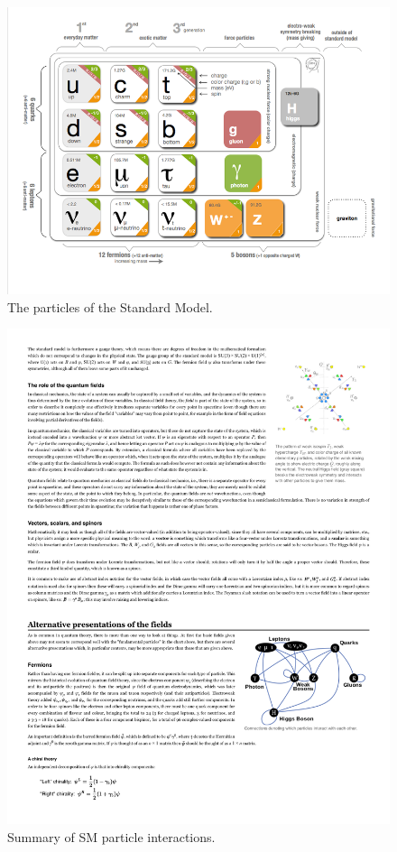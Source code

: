 \begin{figure}[h!]
  \centering
  \includegraphics[width=\hsize]{figures/theory/particles.png}
  \caption{The particles of the Standard Model.} 
  \label{fig:sm_particles}
\end{figure}
\FloatBarrier

\begin{figure}[h!]
  \centering
  \includegraphics[width=\hsize]{figures/theory/particle_interactions.pdf}
  \caption{Summary of SM particle interactions.} 
  \label{fig:sm_particle_interactions}
\end{figure}
\FloatBarrier


